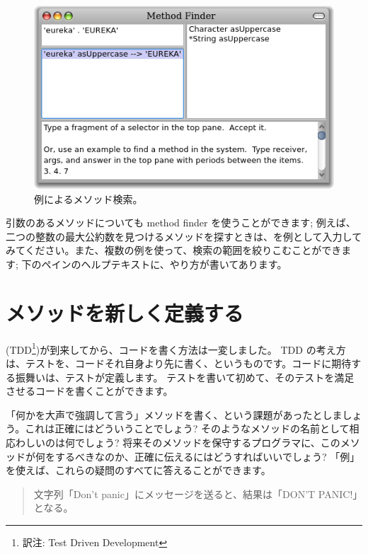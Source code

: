 \documentclass[a4paper,10pt,twoside]{book}
\begin{document}
\begin{figure}[hbt]
\centerline {\includegraphics[width=\textwidth]{MethodFinder-example1}}
\caption{例によるメソッド検索。
}
\end{figure}

引数のあるメソッドについても method finder を使うことができます; 例えば、二つの整数の最大公約数を見つけるメソッドを探すときは、を例として入力してみてください。また、複数の例を使って、検索の範囲を絞りこむことができます; 下のペインのヘルプテキストに、やり方が書いてあります。

\section{メソッドを新しく定義する}

\cite{Beck03a} (TDD\footnote{訳注: Test Driven Development})が到来してから、コードを書く方法は一変しました。
TDD の考え方は、テストを、コードそれ自身より先に書く、というものです。コードに期待する振舞いは、テストが定義します。
テストを書いて初めて、そのテストを満足させるコードを書くことができます。

「何かを大声で強調して言う」メソッドを書く、という課題があったとしましょう。これは正確にはどういうことでしょう? そのようなメソッドの名前として相応わしいのは何でしょう? 将来そのメソッドを保守するプログラマに、このメソッドが何をするべきなのか、正確に伝えるにはどうすればいいでしょう? 「例」を使えば、これらの疑問のすべてに答えることができます。

\begin{quote}
文字列「Don't panic」にメッセージを送ると、結果は「DON'T PANIC!」となる。
\end{quote}
\end{document}
